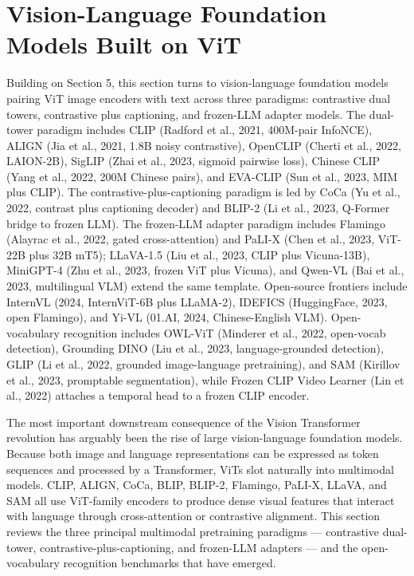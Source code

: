 \section{Vision-Language Foundation Models Built on ViT}\label{vision-language-foundation-models-built-on-vit}

Building on Section 5, this section turns to vision-language foundation models pairing ViT image encoders with text across three paradigms: contrastive dual towers, contrastive plus captioning, and frozen-LLM adapter models. The dual-tower paradigm includes CLIP (Radford et al., 2021, 400M-pair InfoNCE), ALIGN (Jia et al., 2021, 1.8B noisy contrastive), OpenCLIP (Cherti et al., 2022, LAION-2B), SigLIP (Zhai et al., 2023, sigmoid pairwise loss), Chinese CLIP (Yang et al., 2022, 200M Chinese pairs), and EVA-CLIP (Sun et al., 2023, MIM plus CLIP). The contrastive-plus-captioning paradigm is led by CoCa (Yu et al., 2022, contrast plus captioning decoder) and BLIP-2 (Li et al., 2023, Q-Former bridge to frozen LLM). The frozen-LLM adapter paradigm includes Flamingo (Alayrac et al., 2022, gated cross-attention) and PaLI-X (Chen et al., 2023, ViT-22B plus 32B mT5); LLaVA-1.5 (Liu et al., 2023, CLIP plus Vicuna-13B), MiniGPT-4 (Zhu et al., 2023, frozen ViT plus Vicuna), and Qwen-VL (Bai et al., 2023, multilingual VLM) extend the same template. Open-source frontiers include InternVL (2024, InternViT-6B plus LLaMA-2), IDEFICS (HuggingFace, 2023, open Flamingo), and Yi-VL (01.AI, 2024, Chinese-English VLM). Open-vocabulary recognition includes OWL-ViT (Minderer et al., 2022, open-vocab detection), Grounding DINO (Liu et al., 2023, language-grounded detection), GLIP (Li et al., 2022, grounded image-language pretraining), and SAM (Kirillov et al., 2023, promptable segmentation), while Frozen CLIP Video Learner (Lin et al., 2022) attaches a temporal head to a frozen CLIP encoder.

The most important downstream consequence of the Vision Transformer revolution has arguably been the rise of large vision-language foundation models. Because both image and language representations can be expressed as token sequences and processed by a Transformer, ViTs slot naturally into multimodal models. CLIP, ALIGN, CoCa, BLIP, BLIP-2, Flamingo, PaLI-X, LLaVA, and SAM all use ViT-family encoders to produce dense visual features that interact with language through cross-attention or contrastive alignment. This section reviews the three principal multimodal pretraining paradigms --- contrastive dual-tower, contrastive-plus-captioning, and frozen-LLM adapters --- and the open-vocabulary recognition benchmarks that have emerged.


